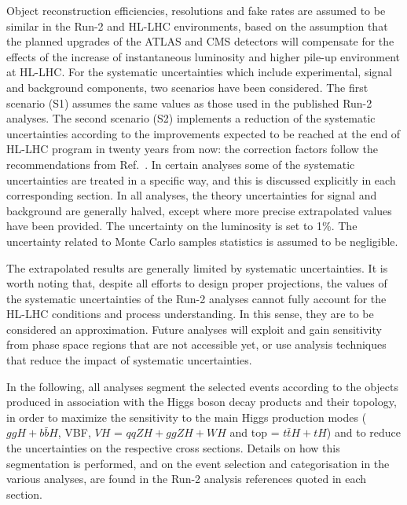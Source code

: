 Object reconstruction efficiencies, resolutions and fake rates are assumed to be similar in the Run-2 and HL-LHC environments, based on the assumption that the planned upgrades of the ATLAS and CMS detectors will compensate for the effects of the increase of instantaneous luminosity and higher pile-up environment at HL-LHC.
For the systematic uncertainties which include experimental, signal and background components, two scenarios have been considered.
The first scenario (S1) assumes the same values as those used in the published Run-2 analyses.
The second scenario (S2) implements a reduction of the systematic uncertainties according to the improvements expected to be reached at the end of HL-LHC program in twenty years from now: the correction factors follow the recommendations from Ref.~\cite{HLHELHCCommonSystematics}.
In certain analyses some of the systematic uncertainties are treated in a specific way, and this is discussed explicitly in each corresponding section.
%
In all analyses, the theory uncertainties for signal and background are generally halved, except where more precise extrapolated values have been provided.
The uncertainty on the luminosity is set to 1\%.
The uncertainty related to Monte Carlo samples statistics is assumed to be negligible.

The extrapolated results are generally limited by systematic uncertainties. It is worth noting that, despite all efforts to design proper projections, the values of the systematic uncertainties of the Run-2 analyses cannot fully account for the HL-LHC conditions and process understanding. In this sense, they are to be considered an approximation. Future analyses will exploit and gain sensitivity from phase space regions that are not accessible yet, or use analysis techniques that reduce the impact of systematic uncertainties.

In the following, all analyses segment the selected events according to the objects produced in association with the Higgs boson decay products and their topology, in order to maximize the sensitivity to the main Higgs production modes ($ggH+b\bar{b}H$, VBF, $VH$ = $qqZH+ggZH+WH$ and top = $t\bar{t}H+tH$)  and to reduce the uncertainties on the respective cross sections. Details on how this segmentation is performed, and on the event selection and categorisation in the various analyses, are found in the Run-2 analysis references quoted in each section.